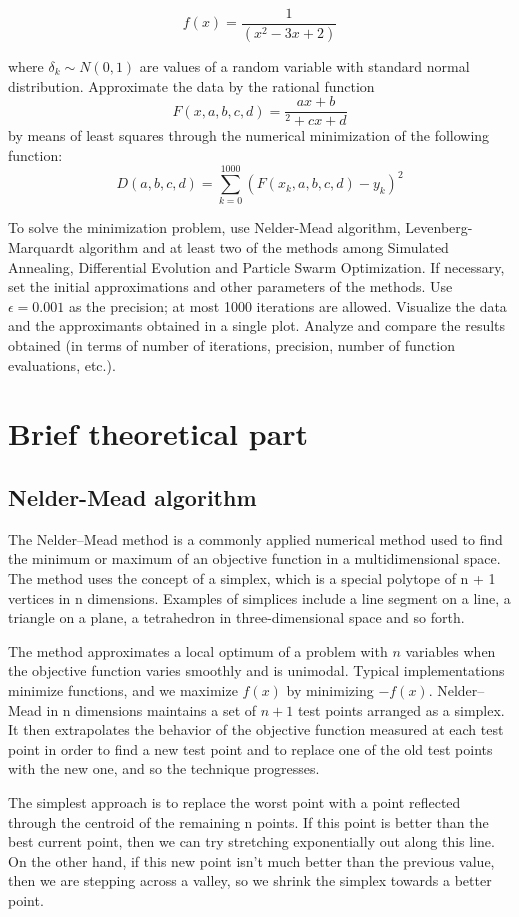 \documentclass[a4paper,article,14pt]{extarticle}
\begin{document}
	$$f(x)=\frac{1}{(x^2-3x+2)}$$
	
	where $\delta_k\sim\textit{N}(0,1)$ are values of a random variable with standard normal distribution. Approximate the data by the rational function $$F(x,a,b,c,d)=\frac{ax+b}{^2+cx+d}$$ by means of least squares through the numerical minimization of the following function: $$D(a,b,c,d) = \sum\limits_{k=0}^{1000} (F(x_k,a,b,c,d)-y_k)^2$$
	
	To solve the minimization problem, use Nelder-Mead algorithm, Levenberg-Marquardt algorithm and at least two of the methods among Simulated Annealing, Differential Evolution and Particle Swarm Optimization. If necessary, set the initial approximations and other parameters of the methods. Use $\epsilon=0.001$ as the precision; at most 1000 iterations are allowed. Visualize the data and the approximants obtained in a single plot. Analyze and compare the results obtained (in terms of number of iterations, precision, number of function evaluations, etc.).
	
	\section{Brief theoretical part}
	\subsection{Nelder-Mead algorithm}
	The Nelder–Mead method is a commonly applied numerical method used to find the minimum or maximum of an objective function in a multidimensional space. The method uses the concept of a simplex, which is a special polytope of n + 1 vertices in n dimensions. Examples of simplices include a line segment on a line, a triangle on a plane, a tetrahedron in three-dimensional space and so forth. 
	
	The method approximates a local optimum of a problem with $n$ variables when the objective function varies smoothly and is unimodal. Typical implementations minimize functions, and we maximize $f(x)$ by minimizing $-f(x)$. Nelder–Mead in n dimensions maintains a set of $n + 1$ test points arranged as a simplex. It then extrapolates the behavior of the objective function measured at each test point in order to find a new test point and to replace one of the old test points with the new one, and so the technique progresses. 
	
	The simplest approach is to replace the worst point with a point reflected through the centroid of the remaining n points. If this point is better than the best current point, then we can try stretching exponentially out along this line. On the other hand, if this new point isn't much better than the previous value, then we are stepping across a valley, so we shrink the simplex towards a better point.
	
\end{document}
